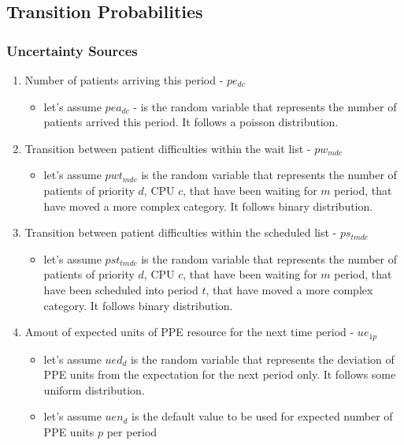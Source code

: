 \documentclass{article}
\begin{document}
\subsection{Transition Probabilities}

\subsubsection{Uncertainty Sources}
\begin{enumerate}
    	
	\item Number of patients arriving this period - $pe_{dc}$
		\begin{itemize}
			\item let's assume $pea_{dc}$ - is the random variable that represents the number of patients arrived this period. It follows a poisson distribution.
		\end{itemize}
	
	\item Transition between patient difficulties within the wait list - $pw_{mdc}$
		\begin{itemize}
			\item let's assume $pwt_{mdc}$ is the random variable that represents the number of patients of priority $d$, CPU $c$, that have been waiting for $m$ period, that have moved a more complex category. It follows binary distribution.
		\end{itemize}
		
	\item Transition between patient difficulties within the scheduled list - $ps_{tmdc}$
		\begin{itemize}
			\item let's assume $pst_{tmdc}$ is the random variable that represents the number of patients of priority $d$, CPU $c$, that have been waiting for $m$ period, that have been scheduled into period $t$, that have moved a more complex category. It follows binary distribution.
		\end{itemize}

	\item Amout of expected units of PPE resource for the next time period - $ue_{1p}$
		\begin{itemize}
			\item let's assume $ued_{d}$ is the random variable that represents the deviation of PPE units from the expectation for the next period only. It follows some uniform distribution.
			\item let's assume $uen_{d}$ is the default value to be used for expected number of PPE units $p$ per period
		\end{itemize}
\end{enumerate}
\end{document}
